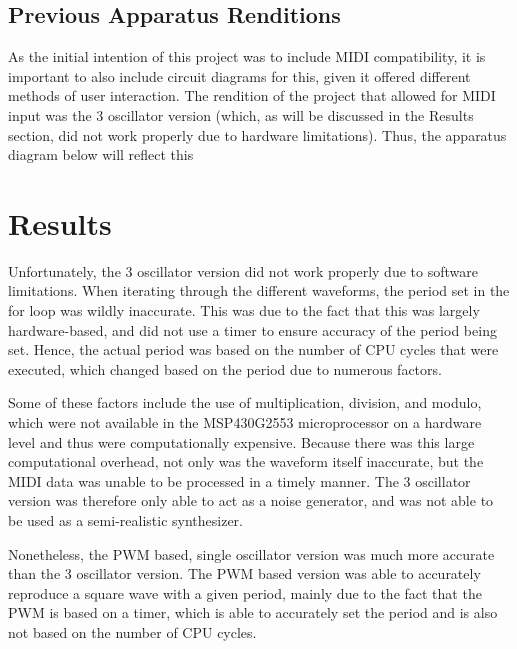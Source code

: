 \documentclass[10pt]{article}
\begin{document}
\subsection{Previous Apparatus Renditions}\label{subsec:previous-apparatus-renditions}

As the initial intention of this project was to include MIDI compatibility, it is important to also include circuit diagrams for this, given it offered different methods of user interaction.
The rendition of the project that allowed for MIDI input was the 3 oscillator version (which, as will be discussed in the Results section, did not work properly due to hardware limitations).
Thus, the apparatus diagram below will reflect this


\section{Results}\label{sec:results}

Unfortunately, the 3 oscillator version did not work properly due to software limitations.
When iterating through the different waveforms, the period set in the for loop was wildly inaccurate.
This was due to the fact that this was largely hardware-based, and did not use a timer to ensure accuracy of the period being set.
Hence, the actual period was based on the number of CPU cycles that were executed, which changed based on the period due to numerous factors.

Some of these factors include the use of multiplication, division, and modulo, which were not available in the MSP430G2553 microprocessor on a hardware level and thus were computationally expensive.
Because there was this large computational overhead, not only was the waveform itself inaccurate, but the MIDI data was unable to be processed in a timely manner.
The 3 oscillator version was therefore only able to act as a noise generator, and was not able to be used as a semi-realistic synthesizer.

Nonetheless, the PWM based, single oscillator version was much more accurate than the 3 oscillator version.
The PWM based version was able to accurately reproduce a square wave with a given period, mainly due to the fact that the PWM is based on a timer, which is able to accurately set the period and is also not based on the number of CPU cycles.
\end{document}
